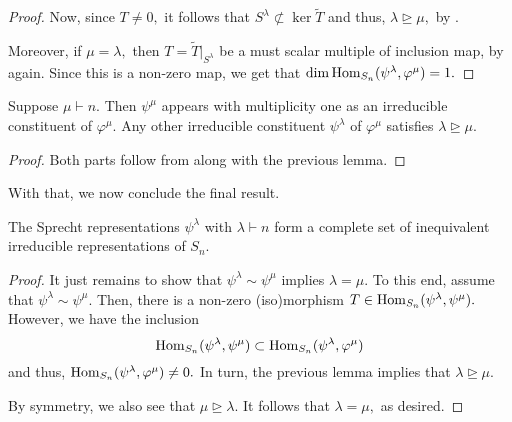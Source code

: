 \begin{proof}

	Now, since $T \neq 0,$ it follows that $S^\lambda \not\subset \ker \widetilde{T}$ and thus, $\lambda \unrhd \mu,$ by .

	Moreover, if $\mu = \lambda,$ then $T = \widetilde{T}|_{S^\lambda}$ be a must scalar multiple of inclusion map, by  again. Since this is a non-zero map, we get that $\dim \operatorname{Hom}_{S_n}(\psi^\lambda, \varphi^\mu) = 1.$
\end{proof}

\begin{cor}
	Suppose $\mu \vdash n.$ Then $\psi^\mu$ appears with multiplicity one as an irreducible constituent of $\varphi^\mu.$ Any other irreducible constituent $\psi^\lambda$ of $\varphi^\mu$ satisfies $\lambda \unrhd \mu.$
\end{cor}
\begin{proof} 
	Both parts follow from  along with the previous lemma.
\end{proof}

With that, we now conclude the final result.

\begin{thm}
	The Sprecht representations $\psi^\lambda$ with $\lambda \vdash n$ form a complete set of inequivalent irreducible representations of $S_n.$
\end{thm}
\begin{proof} 
	It just remains to show that $\psi^\lambda \sim \psi^\mu$ implies $\lambda = \mu.$ To this end, assume that $\psi^\lambda \sim \psi^\mu.$ Then, there is a non-zero (iso)morphism $T \in \operatorname{Hom}_{S_n}(\psi^\lambda, \psi^\mu).$ However, we have the inclusion
	\begin{equation*} 
		\operatorname{Hom}_{S_n}(\psi^\lambda, \psi^\mu) \subset \operatorname{Hom}_{S_n}(\psi^\lambda, \varphi^\mu)
	\end{equation*}
	and thus, $\operatorname{Hom}_{S_n}(\psi^\lambda, \varphi^\mu) \neq 0.$ In turn, the previous lemma implies that $\lambda \unrhd \mu.$ 

	By symmetry, we also see that $\mu \unrhd \lambda.$ It follows that $\lambda = \mu,$ as desired.
\end{proof}

